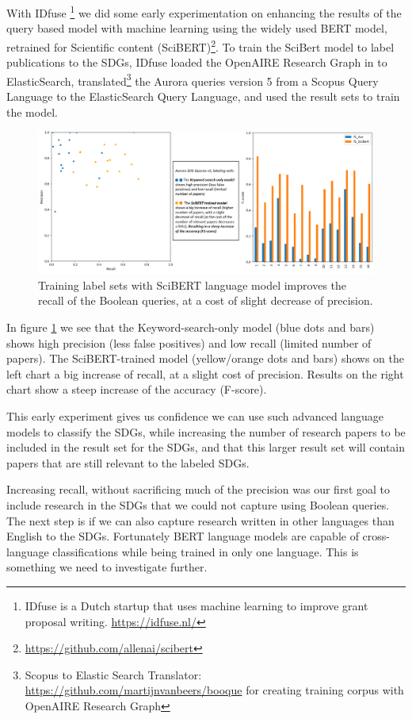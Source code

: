 \documentclass{article}
\begin{document}
With IDfuse \footnote{IDfuse is a Dutch startup that uses machine learning to improve grant proposal writing. \url{https://idfuse.nl/} } we did some early experimentation on enhancing the results of the query based model with machine learning using the widely used BERT model, retrained for Scientific content (SciBERT)\footnote{\url{https://github.com/allenai/scibert}}. 
To train the SciBert model to label publications to the SDGs, IDfuse loaded the OpenAIRE Research Graph in to ElasticSearch, translated\footnote{Scopus to Elastic Search Translator: \url{https://github.com/martijnvanbeers/booque} for creating training corpus with OpenAIRE Research Graph} the Aurora queries version 5 from a Scopus Query Language to the ElasticSearch Query Language, and used the result sets to train the model.

\begin{figure}[H]
	\centering
  \includegraphics[width=\textwidth]{figures/BERTmodel-improves-recall.png}
	\caption{Training label sets with SciBERT language model improves the recall of the Boolean queries, at a cost of slight decrease of precision.}
	\label{BERTmodel}
\end{figure}

In figure \ref{BERTmodel} we see that the Keyword-search-only model (blue dots and bars) shows high precision (less false positives) and low recall (limited number of papers). The SciBERT-trained model (yellow/orange dots and bars) shows on the left chart a big increase of recall, at a slight cost of precision. Results on the right chart show a steep increase of the accuracy (F-score).

This early experiment gives us confidence we can use such advanced language models to classify the SDGs, while increasing the number of research papers to be included in the result set for the SDGs, and that this larger result set will contain papers that are still relevant to the labeled SDGs.

Increasing recall, without sacrificing much of the precision was our first goal to include research in the SDGs that we could not capture using Boolean queries. The next step is if we can also capture research written in other languages than English to the SDGs. Fortunately BERT language models are capable of cross-language classifications while being trained in only one language. This is something we need to investigate further.
\end{document}

